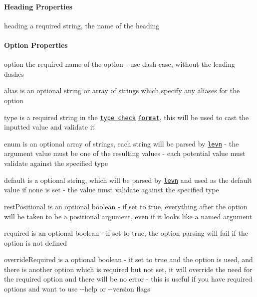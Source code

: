 \paragraph*{Heading Properties}


\begin{DoxyItemize}
\item {\ttfamily heading} a required string, the name of the heading
\end{DoxyItemize}

\paragraph*{Option Properties}


\begin{DoxyItemize}
\item {\ttfamily option} the required name of the option -\/ use dash-\/case, without the leading dashes
\item {\ttfamily alias} is an optional string or array of strings which specify any aliases for the option
\item {\ttfamily type} is a required string in the \href{https://github.com/gkz/type-check}{\tt type check} \href{https://github.com/gkz/type-check#type-format}{\tt format}, this will be used to cast the inputted value and validate it
\item {\ttfamily enum} is an optional array of strings, each string will be parsed by \href{https://github.com/gkz/levn}{\tt levn} -\/ the argument value must be one of the resulting values -\/ each potential value must validate against the specified {\ttfamily type}
\item {\ttfamily default} is a optional string, which will be parsed by \href{https://github.com/gkz/levn}{\tt levn} and used as the default value if none is set -\/ the value must validate against the specified {\ttfamily type}
\item {\ttfamily rest\+Positional} is an optional boolean -\/ if set to {\ttfamily true}, everything after the option will be taken to be a positional argument, even if it looks like a named argument
\item {\ttfamily required} is an optional boolean -\/ if set to {\ttfamily true}, the option parsing will fail if the option is not defined
\item {\ttfamily override\+Required} is a optional boolean -\/ if set to {\ttfamily true} and the option is used, and there is another option which is required but not set, it will override the need for the required option and there will be no error -\/ this is useful if you have required options and want to use {\ttfamily -\/-\/help} or {\ttfamily -\/-\/version} flags

\end{DoxyItemize}
